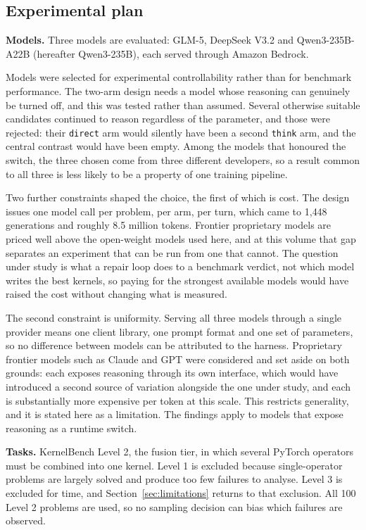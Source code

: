 \documentclass[12pt]{article}
\begin{document}
\subsection{Experimental plan}

\textbf{Models.} Three models are evaluated: GLM-5, DeepSeek V3.2 and
Qwen3-235B-A22B (hereafter Qwen3-235B), each served through Amazon Bedrock.

Models were selected for experimental controllability rather than for benchmark
performance. The two-arm design needs a model whose reasoning can genuinely be
turned off, and this was tested rather than assumed. Several otherwise suitable
candidates continued to reason regardless of the parameter, and those were
rejected: their \texttt{direct} arm would silently have been a second
\texttt{think} arm, and the central contrast would have been empty. Among the
models that honoured the switch, the three chosen come from three different
developers, so a result common to all three is less likely to be a property of
one training pipeline.

Two further constraints shaped the choice, the first of which is cost. The
design issues
one model call per problem, per arm, per turn, which came to 1{,}448
generations and roughly 8.5 million tokens. Frontier proprietary models are
priced well above the open-weight models used here, and at this volume that gap
separates an experiment that can be run from one that cannot. The question under study is what a repair loop does to a benchmark
verdict, not which model writes the best kernels, so paying for the strongest
available models would have raised the cost without changing what is measured.

The second constraint is uniformity. Serving all three models through a single
provider means one client library, one prompt format and one set of parameters,
so no difference between models can be attributed to the harness. Proprietary
frontier models such as Claude and GPT were considered and set aside on both
grounds: each exposes reasoning through its own interface, which would have
introduced a second source of variation alongside the one under study, and each
is substantially more expensive per token at this scale. This restricts
generality, and it is stated here as a limitation. The findings apply to models that
expose reasoning as a runtime switch.

\textbf{Tasks.} KernelBench Level 2, the fusion tier, in which several PyTorch
operators must be combined into one kernel. Level 1 is excluded because
single-operator problems are largely solved and produce too few failures to
analyse. Level 3 is excluded for time, and Section~\ref{sec:limitations}
returns to that exclusion. All 100 Level 2 problems are used, so no sampling
decision can bias which failures are observed.
\end{document}

